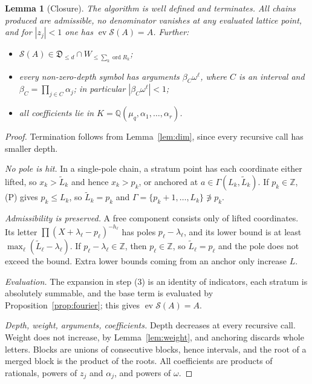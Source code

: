\documentclass[11pt]{amsart}
\newtheorem{lemma}[theorem]{Lemma}
\theoremstyle{definition}
\theoremstyle{remark}
\numberwithin{equation}{section}
\newcommand{\Z}{\mathbb{Z}}
\newcommand{\Q}{\mathbb{Q}}
\newcommand{\ev}{\operatorname{ev}}
\newcommand{\cS}{\mathcal{S}}
\newcommand{\fD}{\mathfrak{D}}
\begin{document}
\begin{lemma}[Closure]\label{lem:closure}
The algorithm is well defined and terminates. All chains produced are admissible, no denominator vanishes at any evaluated lattice point, and for $|z_j|<1$ one has $\ev\cS(A)=A$. Further:
\begin{itemize}[leftmargin=1.5em]
\item $\cS(A)\in\fD_{\le d}\cap W_{\le\sum_k\operatorname{ord}R_k}$;
\item every non-zero-depth symbol has arguments $\beta_C\omega^\ell$, where $C$ is an interval and $\beta_C=\prod_{j\in C}\alpha_j$; in particular $|\beta_C\omega^\ell|<1$;
\item all coefficients lie in $K=\Q(\mu_q,\alpha_1,\dots,\alpha_r)$.
\end{itemize}
\end{lemma}

\begin{proof}
Termination follows from Lemma~\ref{lem:dim}, since every recursive call has smaller depth.

\emph{No pole is hit.} In a single-pole chain, a stratum point has each coordinate either lifted, so $x_k>\tilde L_k$ and hence $x_k>p_k$, or anchored at $a\in\Gamma(L_k,\tilde L_k)$. If $p_k\in\Z$, (P) gives $p_k\le L_k$, so $\tilde L_k=p_k$ and $\Gamma=\{p_k+1,\dots,L_k\}\not\ni p_k$.

\emph{Admissibility is preserved.} A free component consists only of lifted coordinates. Its letter $\prod(X+\lambda_\ell-p_\ell)^{-h_\ell}$ has poles $p_\ell-\lambda_\ell$, and its lower bound is at least $\max_\ell(\tilde L_\ell-\lambda_\ell)$. If $p_\ell-\lambda_\ell\in\Z$, then $p_\ell\in\Z$, so $\tilde L_\ell=p_\ell$ and the pole does not exceed the bound. Extra lower bounds coming from an anchor only increase $L$.

\emph{Evaluation.} The expansion in step (3) is an identity of indicators, each stratum is absolutely summable, and the base term is evaluated by Proposition~\ref{prop:fourier}; this gives $\ev\cS(A)=A$.

\emph{Depth, weight, arguments, coefficients.} Depth decreases at every recursive call. Weight does not increase, by Lemma~\ref{lem:weight}, and anchoring discards whole letters. Blocks are unions of consecutive blocks, hence intervals, and the root of a merged block is the product of the roots. All coefficients are products of rationals, powers of $z_j$ and $\alpha_j$, and powers of $\omega$.
\end{proof}
\end{document}
